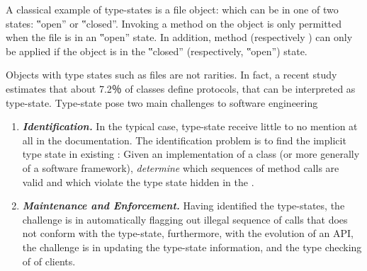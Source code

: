 A classical example of type-states is a file object: which can be in one of two
states: ‟open” or ‟closed”. Invoking a  method on the object is only
permitted when the file is in an ‟open” state. In addition, method 
(respectively ) can only be applied if the object is in the
‟closed” (respectively, ‟open”) state.

Objects with type states such as files are not rarities.
In fact, a recent study~\cite{Beckman:2011} estimates
  that about 7.2％ of \Java classes define protocols, that can be interpreted as type-state.
Type-state pose two main challenges to software engineering
\begin{enumerate}
  \item \emph{\textbf{Identification.}}
    In the typical case, type-state
        receive little to no mention at all in the documentation.
    The identification problem is to find the implicit
    type state in existing \Java: Given an implementation of a class
    (or more generally of a software framework),
    \emph{determine} which sequences of method calls are valid and which violate the
    type state hidden in the \Java.
  \item \emph{\textbf{Maintenance and Enforcement.}}
    Having identified the type-states, the challenge is in automatically flagging out
      illegal sequence of calls that does not conform
      with the type-state, furthermore, with the
      evolution of an API, the challenge is in updating the type-state information,
      and the type checking of \Java of clients.
\end{enumerate}
